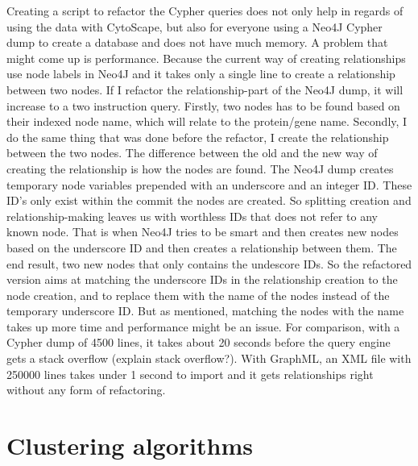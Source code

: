Creating a script to refactor the Cypher queries does not only help in regards
of using the data with CytoScape, but also for everyone using a Neo4J Cypher
dump to create a database and does not have much memory. A problem that might
come up is performance. Because the current way of creating relationships use
node labels in Neo4J and it takes only a single line to create a relationship
between two nodes. If I refactor the relationship-part of the Neo4J dump, it
will increase to a two instruction query. Firstly, two nodes has to be found
based on their indexed node name, which will relate to the protein/gene name.
Secondly, I do the same thing that was done before the refactor, I create the
relationship between the two nodes. The difference between the old and the new
way of creating the relationship is how the nodes are found. The Neo4J dump
creates temporary node variables prepended with an underscore and an integer ID.
These ID's only exist within the commit the nodes are created. So splitting
creation and relationship-making leaves us with worthless IDs that does not
refer to any known node. That is when Neo4J tries to be smart and then creates
new nodes based on the underscore ID and then creates a relationship between
them. The end result, two new nodes that only contains the undescore IDs. So the
refactored version aims at matching the underscore IDs in the relationship
creation to the node creation, and to replace them with the name of the nodes
instead of the temporary underscore ID. But as mentioned, matching the nodes
with the name takes up more time and performance might be an issue. For
comparison, with a Cypher dump of 4500 lines, it takes about 20 seconds before
the query engine gets a stack overflow (explain stack overflow?). With GraphML,
an XML file with 250000 lines takes under 1 second to import and it gets
relationships right without any form of refactoring.

\chapter{Clustering algorithms}

